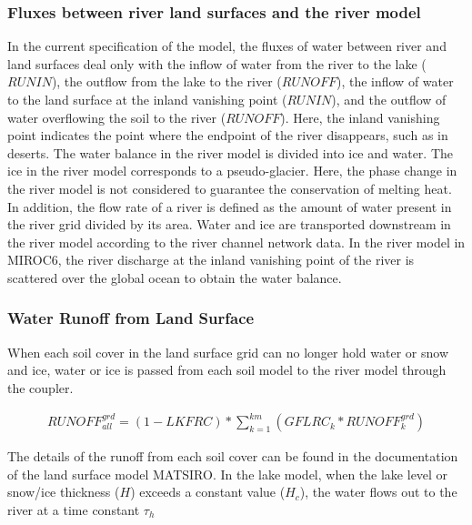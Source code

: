 \hypertarget{fluxes-between-river-land-surfaces-and-the-river-model}{%
\subsubsection{Fluxes between river land surfaces and the river
model}\label{fluxes-between-river-land-surfaces-and-the-river-model}}

In the current specification of the model, the fluxes of water between
river and land surfaces deal only with the inflow of water from the
river to the lake (\(RUNIN\)), the outflow from the lake to the river
(\(RUNOFF\)), the inflow of water to the land surface at the inland
vanishing point (\(RUNIN\)), and the outflow of water overflowing the
soil to the river (\(RUNOFF\)). Here, the inland vanishing point
indicates the point where the endpoint of the river disappears, such as
in deserts. The water balance in the river model is divided into ice and
water. The ice in the river model corresponds to a pseudo-glacier. Here,
the phase change in the river model is not considered to guarantee the
conservation of melting heat. In addition, the flow rate of a river is
defined as the amount of water present in the river grid divided by its
area. Water and ice are transported downstream in the river model
according to the river channel network data. In the river model in
MIROC6, the river discharge at the inland vanishing point of the river
is scattered over the global ocean to obtain the water balance.

\hypertarget{water-runoff-from-land-surface}{%
\subsubsection{Water Runoff from Land
Surface}\label{water-runoff-from-land-surface}}

When each soil cover in the land surface grid can no longer hold water
or snow and ice, water or ice is passed from each soil model to the
river model through the coupler.

\begin{eqnarray} RUNOFF^{grd}_{all} =
    (1-LKFRC) * \sum_{k=1}^{km}(GFLRC_{k} * RUNOFF^{grd}_{k}) \end{eqnarray}

The details of the runoff from each soil cover can be found in the
documentation of the land surface model MATSIRO. In the lake model, when
the lake level or snow/ice thickness (\(H\)) exceeds a constant value
(\(H_c\)), the water flows out to the river at a time constant
\(\tau_h\)

